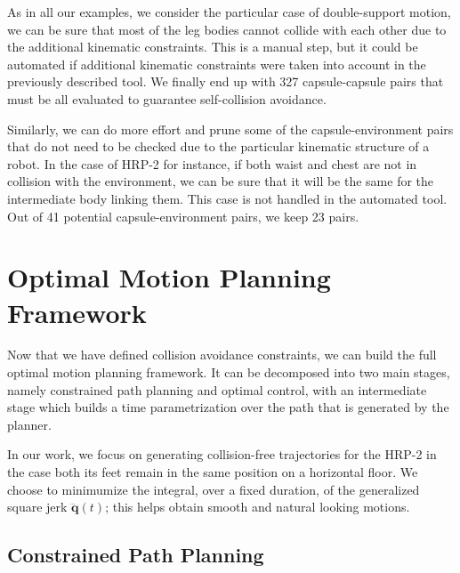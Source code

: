 As in all our examples, we consider the particular case of
double-support motion, we can be sure that most of the leg bodies
cannot collide with each other due to the additional kinematic
constraints. This is a manual step, but it could be automated if
additional kinematic constraints were taken into account in the
previously described tool. We finally end up with 327 capsule-capsule
pairs that must be all evaluated to guarantee self-collision
avoidance.

Similarly, we can do more effort and prune some of the
capsule-environment pairs that do not need to be checked due to the
particular kinematic structure of a robot. In the case of HRP-2 for
instance, if both waist and chest are not in collision with the
environment, we can be sure that it will be the same for the
intermediate body linking them. This case is not handled in the
automated tool. Out of 41 potential capsule-environment pairs, we keep
23 pairs.

\section{Optimal Motion Planning Framework}
\label{sec:chap3-omp-framework}

Now that we have defined collision avoidance constraints, we can build
the full optimal motion planning framework. It can be decomposed into
two main stages, namely constrained path planning and optimal control,
with an intermediate stage which builds a time parametrization over
the path that is generated by the planner.

In our work, we focus on generating collision-free trajectories
for the HRP-2 in the case both its feet remain in the same position on
a horizontal floor. We choose to minimumize the integral, over a fixed
duration, of the generalized square jerk $\dddot{\mathbf{q}}(t)$; this
helps obtain smooth and natural looking motions.

\subsection{Constrained Path Planning}
\label{subsec:chap3-path-planning}

